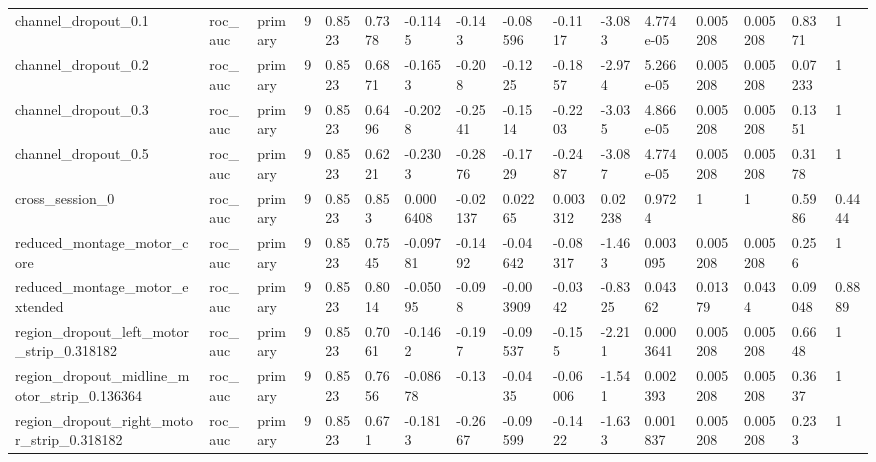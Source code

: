 \begin{tabular}{llllllllllllllll}
channel\_dropout\_0.1 & roc\_auc & primary & 9 & 0.8523 & 0.7378 & -0.1145 & -0.143 & -0.08596 & -0.1117 & -3.083 & 4.774e-05 & 0.005208 & 0.005208 & 0.8371 & 1 \\
channel\_dropout\_0.2 & roc\_auc & primary & 9 & 0.8523 & 0.6871 & -0.1653 & -0.208 & -0.1225 & -0.1857 & -2.974 & 5.266e-05 & 0.005208 & 0.005208 & 0.07233 & 1 \\
channel\_dropout\_0.3 & roc\_auc & primary & 9 & 0.8523 & 0.6496 & -0.2028 & -0.2541 & -0.1514 & -0.2203 & -3.035 & 4.866e-05 & 0.005208 & 0.005208 & 0.1351 & 1 \\
channel\_dropout\_0.5 & roc\_auc & primary & 9 & 0.8523 & 0.6221 & -0.2303 & -0.2876 & -0.1729 & -0.2487 & -3.087 & 4.774e-05 & 0.005208 & 0.005208 & 0.3178 & 1 \\
cross\_session\_0 & roc\_auc & primary & 9 & 0.8523 & 0.853 & 0.0006408 & -0.02137 & 0.02265 & 0.003312 & 0.02238 & 0.9724 & 1 & 1 & 0.5986 & 0.4444 \\
reduced\_montage\_motor\_core & roc\_auc & primary & 9 & 0.8523 & 0.7545 & -0.09781 & -0.1492 & -0.04642 & -0.08317 & -1.463 & 0.003095 & 0.005208 & 0.005208 & 0.256 & 1 \\
reduced\_montage\_motor\_extended & roc\_auc & primary & 9 & 0.8523 & 0.8014 & -0.05095 & -0.098 & -0.003909 & -0.0342 & -0.8325 & 0.04362 & 0.01379 & 0.0434 & 0.09048 & 0.8889 \\
region\_dropout\_left\_motor\_strip\_0.318182 & roc\_auc & primary & 9 & 0.8523 & 0.7061 & -0.1462 & -0.197 & -0.09537 & -0.155 & -2.211 & 0.0003641 & 0.005208 & 0.005208 & 0.6648 & 1 \\
region\_dropout\_midline\_motor\_strip\_0.136364 & roc\_auc & primary & 9 & 0.8523 & 0.7656 & -0.08678 & -0.13 & -0.0435 & -0.06006 & -1.541 & 0.002393 & 0.005208 & 0.005208 & 0.3637 & 1 \\
region\_dropout\_right\_motor\_strip\_0.318182 & roc\_auc & primary & 9 & 0.8523 & 0.671 & -0.1813 & -0.2667 & -0.09599 & -0.1422 & -1.633 & 0.001837 & 0.005208 & 0.005208 & 0.233 & 1 \\
\bottomrule
\end{tabular}
